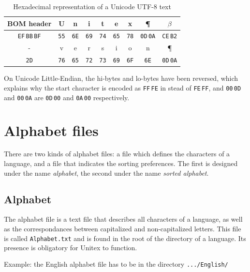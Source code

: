 \bigskip
\begin{table}[!h]
\begin{center}
\begin{tabular}{|c|c|c|c|c|c|c|c|c|}
\hline
BOM header & U & n & i & t & e & x & \P & $\beta$
\\
\hline
\verb+EF+\,\verb+BB+\,\verb+BF+ & \verb+55+ & \verb+6E+ & \verb+69+ & \verb+74+ & \verb+65+ & \verb+78+
& \verb+0D+\,\verb+0A+ & \verb+CE+\,\verb+B2+
\\
\hline
\hline
- & v & e & r & s & i & o & n & \P
\\
\hline
\verb+2D+ & \verb+76+ & \verb+65+ & \verb+72+ & \verb+73+ & \verb+69+ & \verb+6F+
& \verb+6E+ & \verb+0D+\,\verb+0A+
\\
\hline
\end{tabular}
\caption{Hexadecimal representation of a Unicode UTF-8 text}
\end{center}
\end{table}

\bigskip
\noindent On Unicode Little-Endian, the hi-bytes and lo-bytes have been reversed, which explains why the
start character is encoded as \verb+FF+\,\verb+FE+ in stead of \verb+FE+\,\verb+FF+, and
\verb+00+\,\verb+0D+ and \verb+00+\,\verb+0A+ are \verb+0D+\,\verb+00+ and \verb+0A+\,\verb+00+ respectively.



\section{Alphabet files}
There are two kinds of alphabet files: a file which defines the characters of a
language, and a file that indicates the sorting preferences. The first is
designed under the name \textit{alphabet}, the second under the name
\textit{sorted alphabet}.


\subsection{Alphabet}
The alphabet file is a text file that describes all characters of a language, as
well as the correspondances between capitalized and non-capitalized letters. This
file is called \verb+Alphabet.txt+  and is found
in the root of the directory of a language. Its presence is obligatory for Unitex
to function.

\bigskip
\noindent Example: the English alphabet file has to be in the directory
\verb+.../English/+

